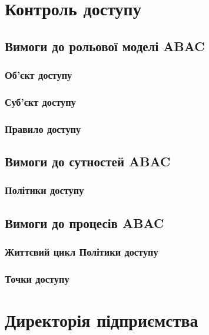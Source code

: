 \newpage
\section{Контроль доступу}

\subsection{Вимоги до рольової моделі ABAC}

\subsubsection{Об'єкт доступу}

\subsubsection{Суб'єкт доступу}

\subsubsection{Правило доступу}

\subsection{Вимоги до сутностей ABAC}

\subsubsection{Політики доступу}

\subsection{Вимоги до процесів ABAC}

\subsubsection{Життєвий цикл Політики доступу}

\subsubsection{Точки доступу}

\newpage
\section{Директорія підприємства}

